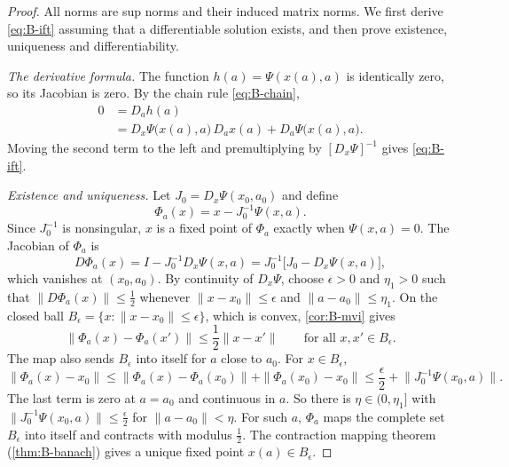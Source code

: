 \begin{proof}
All norms are sup norms and their induced matrix norms. We first derive \eqref{eq:B-ift} assuming that a
differentiable solution exists, and then prove existence, uniqueness and differentiability.

\emph{The derivative formula.} The function $h(a) = \Psi(x(a), a)$ is identically zero, so its Jacobian is zero. By
the chain rule \eqref{eq:B-chain},
\begin{align*}
0 &= D_a h(a) \\
  &= D_x\Psi\big(x(a), a\big)\,D_a x(a) + D_a\Psi\big(x(a), a\big) .
\end{align*}
Moving the second term to the left and premultiplying by $[D_x\Psi]^{-1}$ gives \eqref{eq:B-ift}.

\emph{Existence and uniqueness.} Let $J_0 = D_x\Psi(x_0, a_0)$ and define
\begin{equation*}
\Phi_a(x) = x - J_0^{-1}\Psi(x, a) .
\end{equation*}
Since $J_0^{-1}$ is nonsingular, $x$ is a fixed point of $\Phi_a$ exactly when $\Psi(x, a) = 0$. The Jacobian of $\Phi_a$ is
\begin{equation*}
D\Phi_a(x) = I - J_0^{-1}D_x\Psi(x, a) = J_0^{-1}\big[J_0 - D_x\Psi(x, a)\big] ,
\end{equation*}
which vanishes at $(x_0, a_0)$. By continuity of $D_x\Psi$, choose $\epsilon > 0$ and $\eta_1 > 0$ such that
$\|D\Phi_a(x)\| \leq \frac{1}{2}$ whenever $\|x - x_0\| \leq \epsilon$ and $\|a - a_0\| \leq \eta_1$. On the closed ball
$B_\epsilon = \{x : \|x - x_0\| \leq \epsilon\}$, which is convex, \cref{cor:B-mvi} gives
\begin{equation}\label{eq:B-ift-contraction}
\|\Phi_a(x) - \Phi_a(x')\| \leq \frac{1}{2}\|x - x'\| \qquad\text{for all } x, x' \in B_\epsilon .
\end{equation}
The map also sends $B_\epsilon$ into itself for $a$ close to $a_0$. For $x \in B_\epsilon$,
\begin{equation*}
\|\Phi_a(x) - x_0\| \leq \|\Phi_a(x) - \Phi_a(x_0)\| + \|\Phi_a(x_0) - x_0\| \leq \frac{\epsilon}{2} + \big\|J_0^{-1}\Psi(x_0, a)\big\| .
\end{equation*}
The last term is zero at $a = a_0$ and continuous in $a$. So there is $\eta \in (0, \eta_1]$ with
$\|J_0^{-1}\Psi(x_0, a)\| \leq \frac{\epsilon}{2}$ for $\|a - a_0\| < \eta$. For such $a$, $\Phi_a$ maps the complete set
$B_\epsilon$ into itself and contracts with modulus $\frac{1}{2}$. The contraction mapping theorem (\cref{thm:B-banach}) gives a
unique fixed point $x(a) \in B_\epsilon$.


\end{proof}
